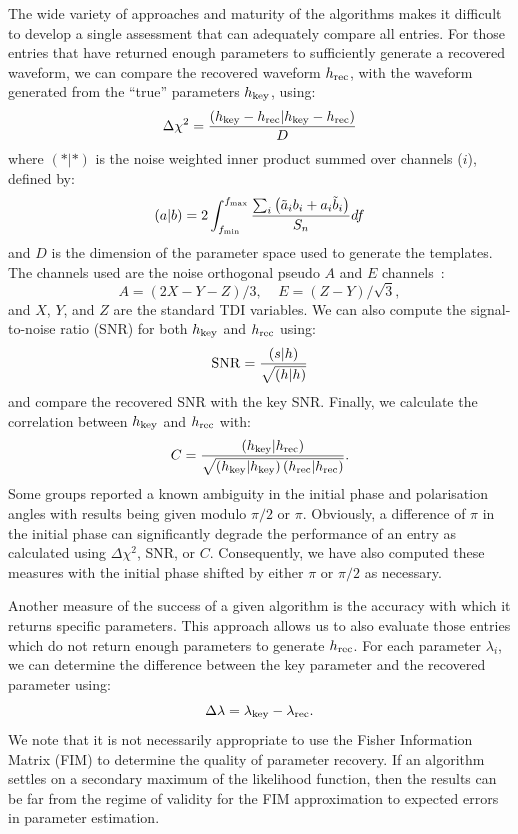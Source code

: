 \documentclass[12pt]{iopart}
\begin{document}
The wide variety of approaches and maturity of the algorithms makes it difficult to develop a single assessment that can adequately compare all entries. For those entries that have returned enough parameters to sufficiently generate a recovered waveform, we can compare the recovered waveform $h_{\rm rec}$, with the waveform generated from the ``true'' parameters $h_{\rm key}$, using:
\begin{equation}
\label{deltachi}
\Delta \chi^2 = \frac{\left(h_{\rm key} - h_{\rm rec}|h_{\rm key} - h_{\rm rec}\right)}{D}
\end{equation}
where $(*|*)$ is the noise weighted inner product summed over channels ($i$), defined by:
\begin{equation}
\left(a|b\right) = 2 \int_{f_{\rm min}}^{f_{\rm max}}{\frac{\sum_{i}{\left(\tilde{a}_ib_i+a_i\tilde{b}_i\right)}}{S_n}df}
\end{equation}
and $D$ is the dimension of the parameter space used to generate the templates. The channels used are the noise orthogonal pseudo $A$ and $E$ channels~\cite{prince02}:
\begin{equation}
A = \left(2X - Y - Z\right)/3,~~~~~E = \left(Z - Y\right)/\sqrt{3},
\end{equation}
and $X$, $Y$, and $Z$ are the standard TDI variables. We can also compute the signal-to-noise ratio (SNR) for both $h_{\rm key}$ and $h_{\rm rec}$ using:
\begin{equation}
\label{snr}
{\rm SNR} = \frac{\left(s|h\right)}{\sqrt{\left(h|h\right)}}
\end{equation}
and compare the recovered SNR with the key SNR. Finally, we calculate the correlation between $h_{\rm key}$ and $h_{\rm rec}$ with:
\begin{equation}
\label{cor}
C = \frac{\left(h_{\rm key}|h_{\rm rec}\right)}{\sqrt{\left(h_{\rm key}|h_{\rm key}\right)\left(h_{\rm rec}|h_{\rm rec}\right)}}.
\end{equation}
Some groups reported a known ambiguity in the initial phase and polarisation angles with results being given modulo $\pi/2$ or $\pi$. Obviously, a difference of $\pi$ in the initial phase can significantly degrade the performance of an entry as calculated using $\Delta\chi^2$, SNR, or $C$. Consequently, we have also computed these measures with the initial phase shifted by either $\pi$ or $\pi/2$ as necessary.

Another measure of the success of a given algorithm is the accuracy with which it returns specific parameters. This approach allows us to also evaluate those entries which do not return enough parameters to generate $h_{\rm rec}$. For each parameter $\lambda_i$, we can determine the difference between the key parameter and the recovered parameter using:
\begin{equation}
\Delta\lambda = \lambda_{\rm key} - \lambda_{\rm rec}.
\end{equation}
We note that it is not necessarily appropriate to use the Fisher Information Matrix (FIM) to determine the quality of parameter recovery. If an algorithm settles on a secondary maximum of the likelihood function, then the results can be far from the regime of validity for the FIM approximation to expected errors in parameter estimation.
\end{document}
